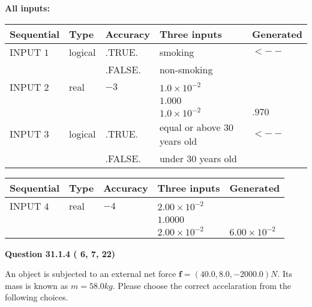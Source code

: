 \documentclass[12pt]{article}
\begin{document}
   
   
   
\noindent\vspace{0.1in}\hspace{-0.08in} {\textbf{\Large{All inputs: }}}
   
   
  
  
\noindent\begin{tabular}{|l|l|l|l|l|}
\hline
 Sequential & Type & Accuracy & Three inputs & Generated \\ 
\hline
 
 
  INPUT $           1$ & logical & .TRUE. & 
 smoking & 
  $ <-- $ 
  \\
  & & .FALSE. & 
  non-smoking & 
 \\  \hline  
 
 
  INPUT $           2$ & real & $          -3 $ & $
 1.0 \times 10^{-2}
  $ & \\
  & & &  $
 1.000
  $ & \\
  & & &  $
 1.0 \times 10^{-2}
 $ & $ .970 $ 
 \\  \hline  
 
 
  INPUT $           3$ & logical & .TRUE. & 
 equal or above 30 years old & 
  $ <-- $ 
  \\
  & & .FALSE. & 
  under 30 years old & 
 \\  \hline  
 \end{tabular}
   
   
  
  
\noindent\begin{tabular}{|l|l|l|l|l|}
\hline
 Sequential & Type & Accuracy & Three inputs & Generated \\ 
\hline
 
 
  INPUT $           4$ & real & $          -4 $ & $
 2.00 \times 10^{-2}
  $ & \\
  & & &  $
 1.0000
  $ & \\
  & & &  $
 2.00 \times 10^{-2}
 $ & $ 6.00 \times 10^{-2} $ 
 \\  \hline  
 \end{tabular}
   
   
  
\vspace{0.2in}
  
{\textbf{\Large{Question
31.1.4 
 (          6,          7,         22)
}}}
  
  
 
An object is subjected to an external net force $\mathbf{f}=(
40.0 ,
8.0,
-2000.0  )N$. Its mass is known as
$m= %
58.0  kg$. Please choose the correct accelaration
from the following choices.
 
\end{document}
